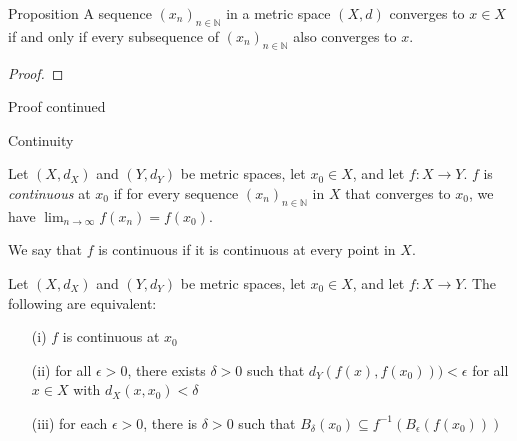 \documentclass [aspectratio=169]{beamer}
\newcommand{\N}{{\mathbb{N}}}
\begin{document}
\begin{frame}
\begin{exampleblock}{Proposition}
A sequence $(x_n)_{n \in \N}$ in a metric space $(X,d)$ converges to $x \in X$ if and only if every subsequence of $(x_n)_{n \in \N}$  also converges to $x$.
\end{exampleblock}
\begin{proof}
\vspace{4cm}
\end{proof}
\end{frame}


\begin{frame}
\begin{block}{Proof continued}
\vspace{4cm}
\end{block}

\vspace{2cm}
\end{frame}


\begin{frame}{Continuity}
\begin{definition}
Let $(X,d_X)$ and $(Y,d_Y)$ be metric spaces, let $x_0 \in X$, and let $f:X\to Y$. $f$ is \emph{continuous} at $x_0$ if for every sequence $(x_n)_{n\in\N}$ in $X$ that converges to $x_0$, we have $\lim_{n\to\infty}f(x_n)=f(x_0)$.

\vspace{1em}

We say that $f$ is continuous if it is continuous at every point in $X$.
\end{definition}
\end{frame}


\begin{frame}
\begin{theorem}
\label{thm:cont_equiv}
Let $(X,d_X)$ and $(Y,d_Y)$ be metric spaces, let $x_0 \in X$, and let $f:X\to Y$. The following are equivalent:
\begin{enumerate}
    \item[(i)] $f$ is continuous at $x_0$
    \item[(ii)] for all $\epsilon>0$, there exists $\delta > 0$ such that $d_Y(f(x),f(x_0))) < \epsilon$ for all $x \in X$ with $d_X(x,x_0) < \delta$
    \item[(iii)] for each $\epsilon>0$, there is $\delta > 0$ such that $B_\delta(x_0) \subseteq f^{-1} (B_\epsilon(f(x_0)))$
\end{enumerate}
\end{theorem}
\end{frame}
\end{document}
